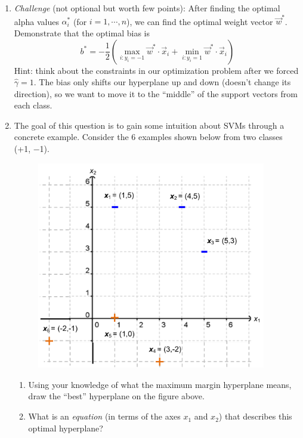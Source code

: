 \documentclass[12pt,letterpaper]{article}
\begin{document}
\begin{enumerate}
\vspace{3mm}

\item {\em Challenge} (not optional but worth few points): After finding the optimal alpha values $\alpha_i^*$ (for $i=1,\cdots,n$), we can find the optimal weight vector $\vec{w}^*$.
Demonstrate that the optimal bias is
\[ b^* = -\frac{1}{2} \left( \max_{i:y_i = -1} \vec{w}^* \cdot \vec{x}_i  + \min_{i:y_i = 1} \vec{w}^* \cdot \vec{x}_i \right) \]
Hint: think about the constraints in our optimization problem after we forced $\hat{\gamma} = 1$. The bias only shifts our hyperplane up and down (doesn't change its direction), so we want to move it to the ``middle'' of the support vectors from each class.

\newpage

\item The goal of this question is to gain some intuition about SVMs through a concrete example.  Consider the 6 examples shown below from two classes (+1, $-$1). 
\begin{figure}[h!]
\center
\includegraphics[width=100mm]{svm_ex.pdf}
\end{figure}

\begin{enumerate}
\item Using your knowledge of what the maximum margin hyperplane means, draw the ``best'' hyperplane on the figure above.
\vspace{3mm}

\item What is an {\em equation} (in terms of the axes $x_1$ and $x_2$) that describes this optimal hyperplane?
\vspace{3mm}


\end{enumerate}
\end{enumerate}
\end{document}
